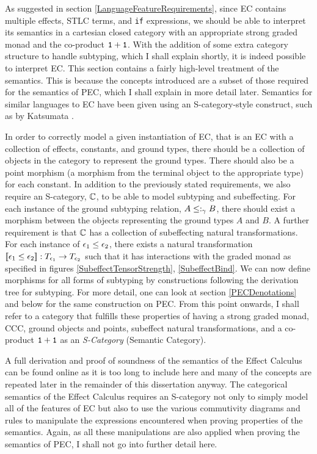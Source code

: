 \documentclass{Report}
\begin{document}
As suggested in section \ref{LanguageFeatureRequirements}, since EC contains multiple effects, STLC terms, and \texttt{if} expressions, we should be able to interpret its semantics in a cartesian closed category with an appropriate strong graded monad and the co-product $\texttt{1} + \texttt{1}$. With the addition of some extra category structure to handle subtyping, which I shall explain shortly, it is indeed possible to interpret EC. This section contains a fairly high-level treatment of the semantics. This is because the concepts introduced are a subset of those required for the semantics of PEC, which I shall explain in more detail later. Semantics for similar languages to EC have been given using an S-category-style construct, such as by Katsumata \cite{Katsumata:2014}.


\begin{framed}
    \begin{definition}[S-Category]
        In order to correctly model a given instantiation of EC, that is an EC with a collection of effects, constants, and ground types, there should be a collection of objects in the category to represent the ground types. There should also be a point morphism (a morphism from the terminal object to the appropriate type) for each constant. In addition to the previously stated requirements, we also require an S-category, $\mathbb{C}$, to be able to model subtyping and subeffecting. For each instance of the ground subtyping relation, $A \leq:_\gamma B$, there should exist a morphism between the objects representing the ground types $A$ and $B$. A further requirement is that $\mathbb{C}$ has a collection of subeffecting natural transformations. For each instance of $\epsilon_1 \leq \epsilon_2$, there exists a natural transformation ${\bf [\![}\epsilon_1\leq\epsilon_2{\bf ]\!]}: T_{\epsilon_1}{}\rightarrow T_{\epsilon_2}{}$ such that it has interactions with the graded monad as specified in figures \ref{SubeffectTensorStrength}, \ref{SubeffectBind}. We can now define morphisms for all forms of subtyping by constructions following the derivation tree for subtyping. For more detail, one can look at section \ref{PECDenotations} and below for the same construction on PEC. From this point onwards, I shall refer to a category that fulfills these properties of having a strong graded monad, CCC, ground objects and points, subeffect natural transformations, and a co-product $\texttt{1} + \texttt{1}$ as an \textit{S-Category} (Semantic Category).
    \end{definition}
\end{framed}

A full derivation and proof of soundness of the semantics of the Effect Calculus can be found online  as it is too long to include here and many of the concepts are repeated later in the remainder of this dissertation anyway. The categorical semantics of the Effect Calculus requires an S-category not only to simply model all of the features of EC but also to use the various commutivity diagrams and rules to manipulate the expressions encountered when proving properties of the semantics. Again, as all these manipulations are also applied when proving the semantics of PEC, I shall not go into further detail here.
\end{document}
